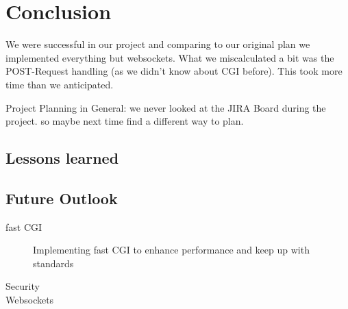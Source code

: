 \section*{Conclusion}
We were successful in our project and comparing to our original plan we implemented everything but websockets. 
What we miscalculated a bit was the POST-Request handling (as we didn't know about CGI before). This took more time than we anticipated. 

Project Planning in General: we never looked at the JIRA Board during the project. so maybe next time find a different way to plan.

\subsection*{Lessons learned}

\subsection*{Future Outlook}
\begin{description}
    \item[fast CGI]Implementing fast CGI to enhance performance and keep up with standards
    \item[Security]
    \item[Websockets]
\end{description}
